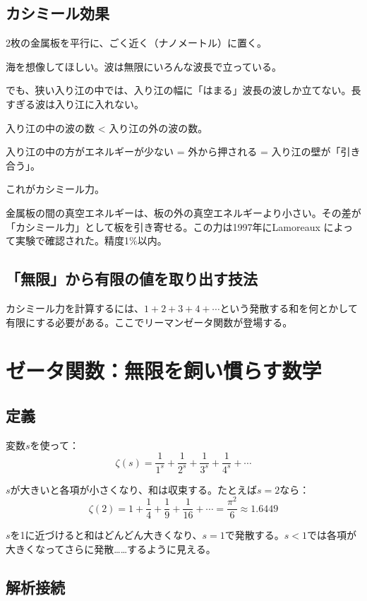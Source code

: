 \documentclass[12pt,a4paper]{article}
\begin{document}
\subsection{カシミール効果}

2枚の金属板を平行に、ごく近く（ナノメートル）に置く。

\begin{storybox}[カシミール効果のたとえ]
海を想像してほしい。波は無限にいろんな波長で立っている。

でも、狭い入り江の中では、入り江の幅に「はまる」波長の波しか立てない。長すぎる波は入り江に入れない。

入り江の中の波の数 < 入り江の外の波の数。

入り江の中の方がエネルギーが少ない = 外から押される = 入り江の壁が「引き合う」。

これがカシミール力。
\end{storybox}

金属板の間の真空エネルギーは、板の外の真空エネルギーより小さい。その差が「カシミール力」として板を引き寄せる。この力は1997年にLamoreaux によって実験で確認された。精度1\%以内。

\subsection{「無限」から有限の値を取り出す技法}

カシミール力を計算するには、$1 + 2 + 3 + 4 + \cdots$という発散する和を何とかして有限にする必要がある。ここでリーマンゼータ関数が登場する。

\section{ゼータ関数：無限を飼い慣らす数学}

\subsection{定義}

変数$s$を使って：
$$\zeta(s) = \frac{1}{1^s} + \frac{1}{2^s} + \frac{1}{3^s} + \frac{1}{4^s} + \cdots$$

$s$が大きいと各項が小さくなり、和は収束する。たとえば$s=2$なら：
$$\zeta(2) = 1 + \frac{1}{4} + \frac{1}{9} + \frac{1}{16} + \cdots = \frac{\pi^2}{6} \approx 1.6449$$

$s$を1に近づけると和はどんどん大きくなり、$s=1$で発散する。$s < 1$では各項が大きくなってさらに発散……するように見える。

\subsection{解析接続}
\end{document}
